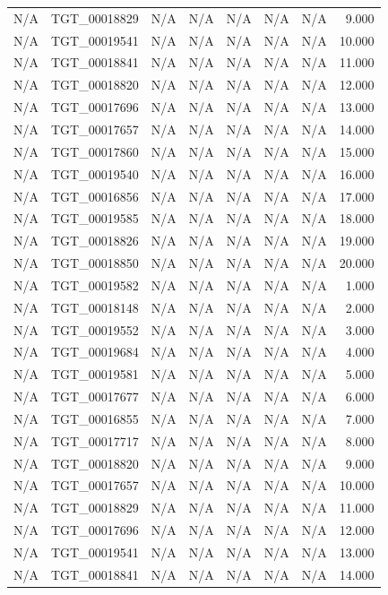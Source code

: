 \begin{table}[h!]
\begin{tabular}{lrrrrrrr}
N/A & TGT\_00018829 & N/A & N/A & N/A & N/A & N/A & 9.000 \\
N/A & TGT\_00019541 & N/A & N/A & N/A & N/A & N/A & 10.000 \\
N/A & TGT\_00018841 & N/A & N/A & N/A & N/A & N/A & 11.000 \\
N/A & TGT\_00018820 & N/A & N/A & N/A & N/A & N/A & 12.000 \\
N/A & TGT\_00017696 & N/A & N/A & N/A & N/A & N/A & 13.000 \\
N/A & TGT\_00017657 & N/A & N/A & N/A & N/A & N/A & 14.000 \\
N/A & TGT\_00017860 & N/A & N/A & N/A & N/A & N/A & 15.000 \\
N/A & TGT\_00019540 & N/A & N/A & N/A & N/A & N/A & 16.000 \\
N/A & TGT\_00016856 & N/A & N/A & N/A & N/A & N/A & 17.000 \\
N/A & TGT\_00019585 & N/A & N/A & N/A & N/A & N/A & 18.000 \\
N/A & TGT\_00018826 & N/A & N/A & N/A & N/A & N/A & 19.000 \\
N/A & TGT\_00018850 & N/A & N/A & N/A & N/A & N/A & 20.000 \\
N/A & TGT\_00019582 & N/A & N/A & N/A & N/A & N/A & 1.000 \\
N/A & TGT\_00018148 & N/A & N/A & N/A & N/A & N/A & 2.000 \\
N/A & TGT\_00019552 & N/A & N/A & N/A & N/A & N/A & 3.000 \\
N/A & TGT\_00019684 & N/A & N/A & N/A & N/A & N/A & 4.000 \\
N/A & TGT\_00019581 & N/A & N/A & N/A & N/A & N/A & 5.000 \\
N/A & TGT\_00017677 & N/A & N/A & N/A & N/A & N/A & 6.000 \\
N/A & TGT\_00016855 & N/A & N/A & N/A & N/A & N/A & 7.000 \\
N/A & TGT\_00017717 & N/A & N/A & N/A & N/A & N/A & 8.000 \\
N/A & TGT\_00018820 & N/A & N/A & N/A & N/A & N/A & 9.000 \\
N/A & TGT\_00017657 & N/A & N/A & N/A & N/A & N/A & 10.000 \\
N/A & TGT\_00018829 & N/A & N/A & N/A & N/A & N/A & 11.000 \\
N/A & TGT\_00017696 & N/A & N/A & N/A & N/A & N/A & 12.000 \\
N/A & TGT\_00019541 & N/A & N/A & N/A & N/A & N/A & 13.000 \\
N/A & TGT\_00018841 & N/A & N/A & N/A & N/A & N/A & 14.000 \\

\end{tabular}
\end{table}
